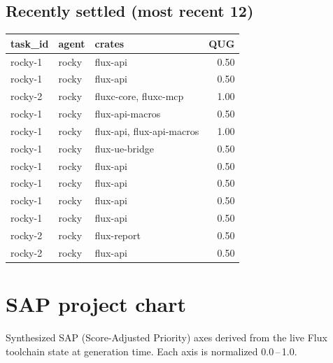 \documentclass[11pt,a4paper]{article}
\begin{document}
\subsection*{Recently settled (most recent 12)}
\begin{tabular}{l l p{7cm} r}
\toprule
\textbf{task\_id} & \textbf{agent} & \textbf{crates} & \textbf{QUG}\\
\midrule
rocky-1 & rocky & flux-api & 0.50\\
rocky-1 & rocky & flux-api & 0.50\\
rocky-2 & rocky & fluxc-core, fluxc-mcp & 1.00\\
rocky-1 & rocky & flux-api-macros & 0.50\\
rocky-1 & rocky & flux-api, flux-api-macros & 1.00\\
rocky-1 & rocky & flux-ue-bridge & 0.50\\
rocky-1 & rocky & flux-api & 0.50\\
rocky-1 & rocky & flux-api & 0.50\\
rocky-1 & rocky & flux-api & 0.50\\
rocky-1 & rocky & flux-api & 0.50\\
rocky-2 & rocky & flux-report & 0.50\\
rocky-2 & rocky & flux-api & 0.50\\
\bottomrule
\end{tabular}

\section{SAP project chart}
Synthesized SAP (Score-Adjusted Priority) axes derived from the live Flux toolchain state at generation time. Each axis is normalized 0.0\,--\,1.0.

\begin{center}
\end{center}
\end{document}
